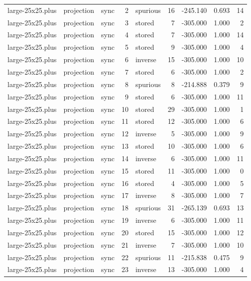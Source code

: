 \begin{tabular}{lllrlrrrr}
large-25x25.plus & projection & sync & 2 & spurious & 16 & -245.140 & 0.693 & 14 \\
large-25x25.plus & projection & sync & 3 & stored & 7 & -305.000 & 1.000 & 2 \\
large-25x25.plus & projection & sync & 4 & stored & 7 & -305.000 & 1.000 & 14 \\
large-25x25.plus & projection & sync & 5 & stored & 9 & -305.000 & 1.000 & 4 \\
large-25x25.plus & projection & sync & 6 & inverse & 15 & -305.000 & 1.000 & 10 \\
large-25x25.plus & projection & sync & 7 & stored & 6 & -305.000 & 1.000 & 2 \\
large-25x25.plus & projection & sync & 8 & spurious & 8 & -214.888 & 0.379 & 9 \\
large-25x25.plus & projection & sync & 9 & stored & 6 & -305.000 & 1.000 & 11 \\
large-25x25.plus & projection & sync & 10 & stored & 29 & -305.000 & 1.000 & 1 \\
large-25x25.plus & projection & sync & 11 & stored & 12 & -305.000 & 1.000 & 6 \\
large-25x25.plus & projection & sync & 12 & inverse & 5 & -305.000 & 1.000 & 9 \\
large-25x25.plus & projection & sync & 13 & stored & 10 & -305.000 & 1.000 & 6 \\
large-25x25.plus & projection & sync & 14 & inverse & 6 & -305.000 & 1.000 & 11 \\
large-25x25.plus & projection & sync & 15 & stored & 11 & -305.000 & 1.000 & 0 \\
large-25x25.plus & projection & sync & 16 & stored & 4 & -305.000 & 1.000 & 5 \\
large-25x25.plus & projection & sync & 17 & inverse & 8 & -305.000 & 1.000 & 7 \\
large-25x25.plus & projection & sync & 18 & spurious & 31 & -265.139 & 0.693 & 13 \\
large-25x25.plus & projection & sync & 19 & inverse & 6 & -305.000 & 1.000 & 11 \\
large-25x25.plus & projection & sync & 20 & stored & 15 & -305.000 & 1.000 & 12 \\
large-25x25.plus & projection & sync & 21 & inverse & 7 & -305.000 & 1.000 & 10 \\
large-25x25.plus & projection & sync & 22 & spurious & 11 & -215.838 & 0.475 & 9 \\
large-25x25.plus & projection & sync & 23 & inverse & 13 & -305.000 & 1.000 & 4 \\

\end{tabular}
